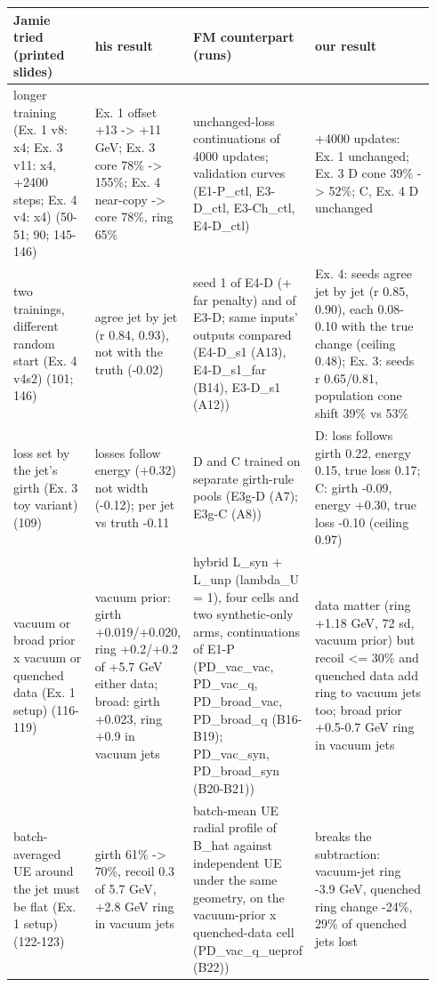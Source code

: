 \tiny
\setlength{\tabcolsep}{2.5pt}
\begin{tabular}{p{0.2\linewidth}p{0.22\linewidth}p{0.22\linewidth}p{0.3\linewidth}}
\toprule
Jamie tried (printed slides) & his result & FM counterpart (runs) & our result \\
\midrule
longer training (Ex. 1 v8: x4; Ex. 3 v11: x4, +2400 steps; Ex. 4 v4: x4) (50-51; 90; 145-146) & Ex. 1 offset +13 -> +11 GeV; Ex. 3 core 78\% -> 155\%; Ex. 4 near-copy -> core 78\%, ring 65\% & unchanged-loss continuations of 4000 updates; validation curves (E1-P\_ctl, E3-D\_ctl, E3-Ch\_ctl, E4-D\_ctl) & +4000 updates: Ex. 1 unchanged; Ex. 3 D cone 39\% -> 52\%; C, Ex. 4 D unchanged \\
two trainings, different random start (Ex. 4 v4s2) (101; 146) & agree jet by jet (r 0.84, 0.93), not with the truth (-0.02) & seed 1 of E4-D (+ far penalty) and of E3-D; same inputs' outputs compared (E4-D\_s1 (A13), E4-D\_s1\_far (B14), E3-D\_s1 (A12)) & Ex. 4: seeds agree jet by jet (r 0.85, 0.90), each 0.08-0.10 with the true change (ceiling 0.48); Ex. 3: seeds r 0.65/0.81, population cone shift 39\% vs 53\% \\
loss set by the jet's girth (Ex. 3 toy variant) (109) & losses follow energy (+0.32) not width (-0.12); per jet vs truth -0.11 & D and C trained on separate girth-rule pools (E3g-D (A7); E3g-C (A8)) & D: loss follows girth 0.22, energy 0.15, true loss 0.17; C: girth -0.09, energy +0.30, true loss -0.10 (ceiling 0.97) \\
vacuum or broad prior x vacuum or quenched data (Ex. 1 setup) (116-119) & vacuum prior: girth +0.019/+0.020, ring +0.2/+0.2 of +5.7 GeV either data; broad: girth +0.023, ring +0.9 in vacuum jets & hybrid L\_syn + L\_unp (lambda\_U = 1), four cells and two synthetic-only arms, continuations of E1-P (PD\_vac\_vac, PD\_vac\_q, PD\_broad\_vac, PD\_broad\_q (B16-B19); PD\_vac\_syn, PD\_broad\_syn (B20-B21)) & data matter (ring +1.18 GeV, 72 sd, vacuum prior) but recoil <= 30\% and quenched data add ring to vacuum jets too; broad prior +0.5-0.7 GeV ring in vacuum jets \\
batch-averaged UE around the jet must be flat (Ex. 1 setup) (122-123) & girth 61\% -> 70\%, recoil 0.3 of 5.7 GeV, +2.8 GeV ring in vacuum jets & batch-mean UE radial profile of B\_hat against independent UE under the same geometry, on the vacuum-prior x quenched-data cell (PD\_vac\_q\_ueprof (B22)) & breaks the subtraction: vacuum-jet ring -3.9 GeV, quenched ring change -24\%, 29\% of quenched jets lost \\

\end{tabular}
